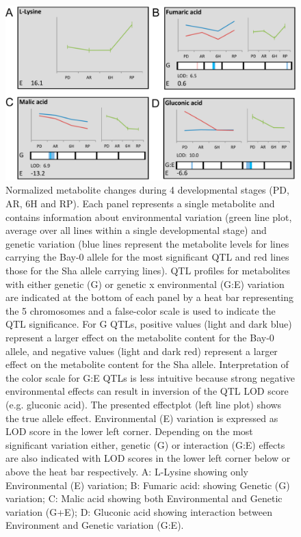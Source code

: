 \begin{figure}[h!]
  \centering
  \includegraphics[keepaspectratio,scale=0.20]{eps/image_3_2_4.eps}
  \caption[Normalized metabolite changes]{Normalized metabolite changes during 4 developmental stages (PD, 
          AR, 6H and RP). Each panel represents a single metabolite and contains information about environmental 
          variation (green line plot, average over all lines within a single developmental stage) and genetic 
          variation (blue lines represent the metabolite levels for lines carrying the Bay-0 allele for the most 
          significant QTL and red lines those for the Sha allele carrying lines). QTL profiles for metabolites 
          with either genetic (G) or genetic x environmental (G:E) variation are indicated at the bottom of each 
          panel by a heat bar representing the 5 chromosomes and a false-color scale is used to indicate the QTL 
          significance. For G QTLs, positive values (light and dark blue) represent a larger effect on the metabolite 
          content for the Bay-0 allele, and negative values (light and dark red) represent a larger effect on the 
          metabolite content for the Sha allele. Interpretation of the color scale for G:E QTLs is less intuitive 
          because strong negative environmental effects can result in inversion of the QTL LOD score (e.g. gluconic acid). 
          The presented effectplot (left line plot) shows the true allele effect. Environmental (E) variation is 
          expressed as LOD score in the lower left corner. Depending on the most significant variation either, 
          genetic (G) or interaction (G:E) effects are also indicated with LOD scores in the lower left corner below 
          or above the heat bar respectively. A: L-Lysine showing only Environmental (E) variation; B: Fumaric acid: 
          showing Genetic (G) variation; C: Malic acid showing both Environmental and Genetic variation (G+E); D: 
          Gluconic acid showing interaction between Environment and Genetic variation (G:E).}
          \label{fig:normMetabolites}
\end{figure}

